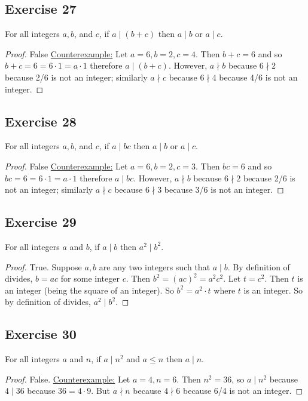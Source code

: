 \documentclass[14pt]{extarticle}
\begin{document}
\subsection{Exercise 27}
For all integers $a, b$, and $c$, if $a\mid (b + c)$ then $a \mid b$ or $a\mid c$.

\begin{proof}
False \underline{Counterexample:} Let $a=6,b=2,c=4$. Then $b+c = 6$ and so $b+c = 6 = 6 \cdot 1 = a \cdot 1$ therefore $a \mid (b+c)$. However, $a \nmid b$ because $6 \nmid 2$ because 2/6 is not an integer; similarly $a \nmid c$ because $6 \nmid 4$ because 4/6 is not an integer.
\end{proof}

\subsection{Exercise 28}
For all integers $a, b$, and $c$, if $a\mid bc$ then $a\mid b$ or $a\mid c$.

\begin{proof}
False \underline{Counterexample:} Let $a=6,b=2,c=3$. Then $bc = 6$ and so $bc = 6 = 6 \cdot 1 = a \cdot 1$ therefore $a \mid bc$. However, $a \nmid b$ because $6 \nmid 2$ because 2/6 is not an integer; similarly $a \nmid c$ because $6 \nmid 3$ because 3/6 is not an integer.
\end{proof}

\subsection{Exercise 29}
For all integers $a$ and $b$, if $a\mid b$ then $a^2 \mid b^2$.

\begin{proof}
True. Suppose $a,b$ are any two integers such that $a \mid b$. By definition of divides, $b = ac$ for some integer $c$. Then $b^2 = (ac)^2 = a^2c^2$. Let $t = c^2$. Then $t$ is an integer (being the square of an integer). So $b^2 = a^2 \cdot t$ where $t$ is an integer. So by definition of divides, $a^2 \mid b^2$.
\end{proof}

\subsection{Exercise 30}
For all integers $a$ and $n$, if $a\mid n^2$ and $a \leq n$ then $a \mid n$.

\begin{proof}
False. \underline{Counterexample:} Let $a = 4, n = 6$. Then $n^2 = 36$, so $a \mid n^2$ because $4 \mid 36$ because $36 = 4 \cdot 9$. But $a \nmid n$ because $4 \nmid 6$ because 6/4 is not an integer.
\end{proof}
\end{document}
